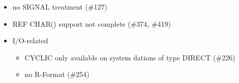 \documentclass[oneside,10pt]{scrbook}
\begin{document}
\begin{itemize}
\item no SIGNAL treatment (\#127)
\item REF CHAR() support not complete (\#374, \#419)
\item I/O-related
   \begin{itemize}
   \item CYCLIC only available on system dations of type DIRECT (\#226)
   \item no R-Format (\#254)
   \end{itemize}


\end{itemize}
\end{document}
